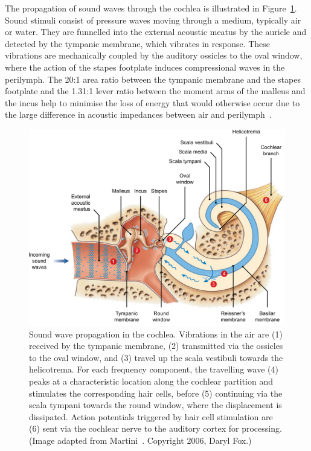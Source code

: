 The propagation of sound waves through the cochlea is illustrated in
Figure~\ref{fig:travelling_wave}. Sound stimuli consist of pressure waves moving
through a medium, typically air or water. They are funnelled into the external
acoustic meatus by the auricle and detected by the tympanic membrane, which
vibrates in response. These vibrations are mechanically coupled by the auditory
ossicles to the oval window, where the action of the stapes footplate induces
compressional waves in the perilymph. The 20:1 area ratio between the tympanic
membrane and the stapes footplate and the 1.31:1 lever ratio between the moment
arms of the malleus and the incus help to minimise the loss of energy that would
otherwise occur due to the large difference in acoustic impedances between air
and perilymph~\cite{flint2010}.

\begin{figure}
	\centering
	\includegraphics[width=\textwidth]{Background/normal_hearing.pdf}
	\caption[Sound wave propagation in the cochlea]{Sound wave propagation in the
	cochlea. Vibrations in the air are (1) received by the tympanic membrane, (2)
	transmitted via the ossicles to the oval window, and (3) travel up the scala
	vestibuli towards the helicotrema. For each frequency component, the
	travelling wave (4) peaks at a characteristic location along the cochlear
	partition and stimulates the corresponding hair cells, before (5) continuing
	via the scala tympani towards the round window, where the displacement is
	dissipated. Action potentials triggered by hair cell stimulation are (6) sent
	via the cochlear nerve to the auditory cortex for processing. (Image adapted
	from Martini~\etal\cite{martini2006}. Copyright \textcopyright{} 2006,
	Daryl Fox.)}
	\label{fig:travelling_wave}
\end{figure}

